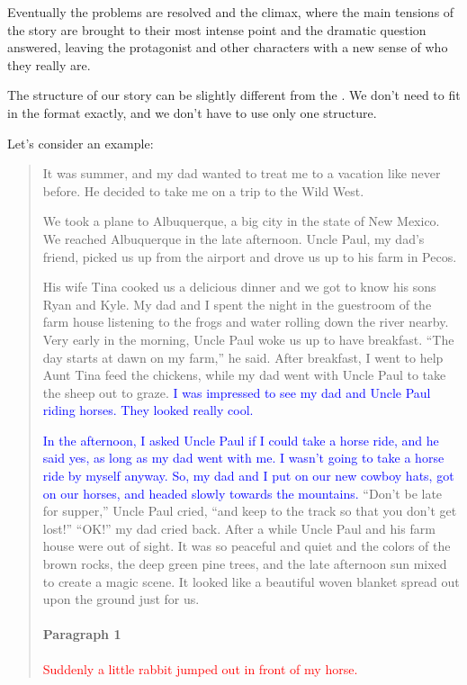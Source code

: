 Eventually the problems are resolved and the climax, where the main tensions of 
the story are brought to their most intense point and the dramatic question 
answered, leaving the protagonist and other characters with a new sense of who 
they really are.

The structure of our story can be slightly different from the \TriActStruct . We 
don't need to fit in the format exactly, and we don't have to use only one 
structure.

Let's consider an example:

\begin{quotation}
{
\sffamily
It was summer, and my dad wanted to treat me to a vacation like never before. He 
decided to take me on a trip to the Wild West.

We took a plane to Albuquerque, a big city in the state of New Mexico. We reached 
Albuquerque in the late afternoon. Uncle Paul, my dad's friend, picked us up from 
the airport and drove us up to his farm in Pecos.

His wife Tina cooked us a delicious dinner and we got to know his sons Ryan and 
Kyle. My dad and I spent the night in the guestroom of the farm house listening 
to the frogs and water rolling down the river nearby. Very early in the morning, 
Uncle Paul woke us up to have breakfast. ``The day starts at dawn on my farm,'' 
he said. After breakfast, I went to help Aunt Tina feed the chickens, while my 
dad went with Uncle Paul to take the sheep out to graze. \textcolor{blue}{I was 
impressed to see my dad and Uncle Paul riding horses. They looked really cool.}

\textcolor{blue}{In the afternoon, I asked Uncle Paul if I could take a horse 
ride, and he said yes, as long as my dad went with me. I wasn't going to take a 
horse ride by myself anyway. So, my dad and I put on our new cowboy hats, got on 
our horses, and headed slowly towards the mountains.} ``Don't be late for 
supper,'' Uncle Paul cried, ``and keep to the track so that you don't get lost!'' 
``OK!'' my dad cried back. After a while Uncle Paul and his farm house were out 
of sight. It was so peaceful and quiet and the colors of the brown rocks, the 
deep green pine trees, and the late afternoon sun mixed to create a magic scene. 
It looked like a beautiful woven blanket spread out upon the ground just for us. 

\paragraph{Paragraph 1} 
\textcolor{red}{Suddenly a little rabbit jumped out in front of my horse.}

}
\end{quotation}
